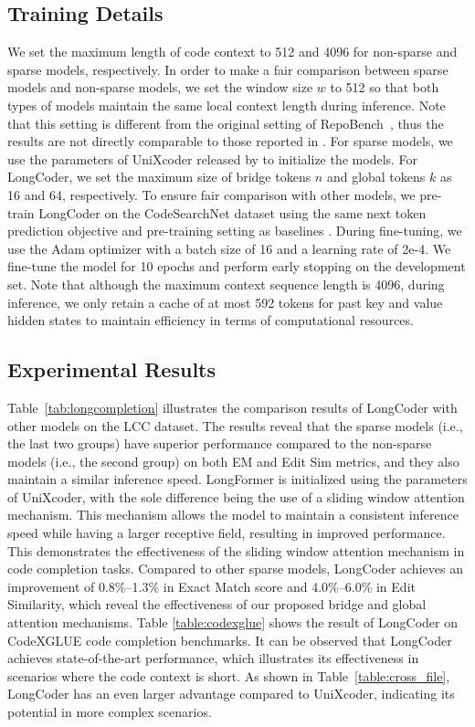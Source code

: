 \documentclass{article}
\begin{document}
\subsection{Training Details}
We set the maximum length of code context to 512 and 4096 for non-sparse and sparse models, respectively. In order to make a fair comparison between sparse models and non-sparse models, we set the window size $w$ to 512 so that both types of models maintain the same local context length during inference. Note that this setting is different from the original setting of RepoBench~\citep{repobench}, thus the results are not directly comparable to those reported in \citet{repobench}. For sparse models, we use the parameters of  UniXcoder released by \citet{guo2022unixcoder} to initialize the models. For LongCoder, we set the maximum size of bridge tokens $n$ and global tokens $k$ as 16 and 64, respectively. To ensure fair comparison with other models, we pre-train LongCoder on the CodeSearchNet dataset using the same next token prediction objective and pre-training setting as baselines \cite{lu2021codexglue,guo2022unixcoder}. During fine-tuning, we use the Adam optimizer with a batch size of 16 and a learning rate of 2e-4. We fine-tune the model for 10 epochs and perform early stopping on the development set. Note that although the maximum context sequence length is 4096, during inference, we only retain a cache of at most 592 tokens for past key and value hidden states to maintain efficiency in terms of computational resources. 

\subsection{Experimental Results}
Table~\ref{tab:longcompletion} illustrates the comparison results of LongCoder with other models on the LCC dataset. The results reveal that the sparse models (i.e., the last two groups) have superior performance compared to the non-sparse models (i.e., the second group) on both EM and Edit Sim metrics, and they also maintain a similar inference speed. LongFormer is initialized using the parameters of UniXcoder, with the sole difference being the use of a sliding window attention mechanism. This mechanism allows the model to maintain a consistent inference speed while having a larger receptive field, resulting in improved performance. This demonstrates the effectiveness of the sliding window attention mechanism in code completion tasks. Compared to other sparse models, LongCoder achieves an improvement of 0.8\%--1.3\% in Exact Match score and 4.0\%--6.0\% in Edit Similarity, which reveal the effectiveness of our proposed bridge and global attention mechanisms.
Table \ref{table:codexglue} shows the result of LongCoder on CodeXGLUE code completion benchmarks. It can be observed that LongCoder achieves state-of-the-art performance, which illustrates its effectiveness in scenarios where the code context is short. As shown in Table~\ref{table:cross_file}, LongCoder has an even larger advantage compared to UniXcoder, indicating its potential in more complex scenarios.
\end{document}
